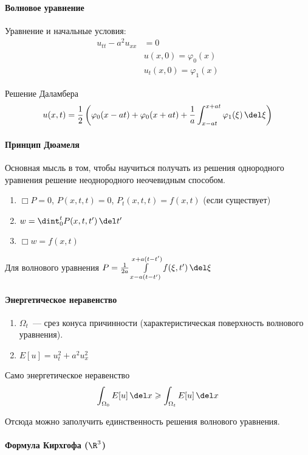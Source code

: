 \documentclass[exam]{trchesh}
\newcommand{\waveop}{\mathop{\boldsymbol\Box}}
\begin{document}
\paragraph{Волновое уравнение}

Уравнение и начальные условия:
\begin{align*}
  u_{tt} - a^2 u_{xx} &= 0 \\
                & u(x,0) = \varphi_0(x) \\
                & u_t(x,0) = \varphi_1(x) 
\end{align*}

Решение Даламбера 
\[
  u(x,t) = \frac12 \left( \varphi_0 (x - at) + \varphi_0(x+at) + 
  \frac{1}{a} \int_{x-at}^{x+at} \varphi_1 (\xi)\, \del\xi \right)
\]

\paragraph{Принцип Дюамеля}
Основная мысль в том, чтобы научиться получать из решения однородного уравнения
решение неоднородного неочевидным способом.
\begin{enumerate}
  \item $\waveop P = 0$, $P(x,t,t) = 0$, $P_t(x,t,t) = f(x,t)$ (если существует)
  \item $w = \dint_0^t P(x,t,t') \, \del t'$
  \item $\waveop w = f(x,t)$
\end{enumerate}
Для волнового уравнения $P = \frac{1}{2a} \int\limits_{x-a(t-t')}^{x+a(t-t')} f(\xi, t')\,\del\xi$


\paragraph{Энергетическое неравенство}

\begin{enumerate}
  \item $\Omega_t$~--- срез конуса причинности 
    (характеристическая поверхность волнового уравнения).
  \item $E[u] = u_t^2 + a^2 u_x^2$
\end{enumerate}
Само энергетическое неравенство
\[
  \int_{\Omega_0} E[u] \, \del x \geqslant \int_{\Omega_t} E[u] \, \del x
\]

Отсюда можно заполучить единственность решения волнового уравнения.

\paragraph{Формула Кирхгофа (\texorpdfstring{$\R^3$}{3D})}
\end{document}
